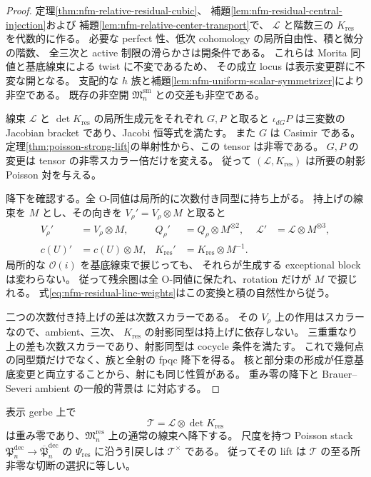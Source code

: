 \begin{proof}
定理\ref{thm:nfm-relative-residual-cubic}、
補題\ref{lem:nfm-residual-central-injection}および
補題\ref{lem:nfm-relative-center-transport}で、
$\mathcal L$ と階数三の $K_{\mathrm{res}}$ を代数的に作る。
必要な perfect 性、低次 cohomology の局所自由性、積と微分の階数、
全三次と active 制限の滑らかさは開条件である。
これらは Morita 同値と基底線束による twist に不変であるため、
その成立 locus は表示変更群に不変な開となる。
支配的な $h$ 族と補題\ref{lem:nfm-uniform-scalar-symmetrizer}により非空である。
既存の非空開 $\mathfrak M_n^{\mathrm{sm}}$ との交差も非空である。

線束 $\mathcal L$ と $\det K_{\mathrm{res}}$ の局所生成元をそれぞれ $G,P$ と取ると
$\iota_{dG}P$ は三変数の Jacobian bracket であり、Jacobi 恒等式を満たす。
また $G$ は Casimir である。
定理\ref{thm:poisson-strong-lift}の単射性から、この tensor は非零である。
$G,P$ の変更は tensor の非零スカラー倍だけを変える。
従って $(\mathcal L,K_{\mathrm{res}})$ は所要の射影 Poisson 対を与える。

降下を確認する。全 O-同値は局所的に次数付き同型に持ち上がる。
持上げの線束を $M$ とし、その向きを $V_\rho'=V_\rho\otimes M$ と取ると
\begin{equation}
\label{eq:nfm-residual-line-weights}
 \begin{aligned}
 V_\rho'&=V_\rho\otimes M,&
 Q_\rho'&=Q_\rho\otimes M^{\otimes2},&
 \mathcal L'&=\mathcal L\otimes M^{\otimes3},\\
 c(U)'&=c(U)\otimes M,&
 K_{\mathrm{res}}'&=K_{\mathrm{res}}\otimes M^{-1}.
 \end{aligned}
\end{equation}
局所的な $\mathcal O(i)$ を基底線束で捩じっても、
それらが生成する exceptional block は変わらない。
従って残余圏は全 O-同値に保たれ、rotation だけが $M$ で捩じれる。
式\eqref{eq:nfm-residual-line-weights}はこの変換と積の自然性から従う。

二つの次数付き持上げの差は次数スカラーである。
その $V_\rho$ 上の作用はスカラーなので、ambient、三次、
$K_{\mathrm{res}}$ の射影同型は持上げに依存しない。
三重重なり上の差も次数スカラーであり、射影同型は cocycle 条件を満たす。
これで幾何点の同型類だけでなく、族と全射の fpqc 降下を得る。
核と部分束の形成が任意基底変更と両立することから、射にも同じ性質がある。
重み零の降下と Brauer--Severi ambient の一般的背景は
\cite[Proposition~4.10; Remark~6.1]{NFMBerghSchnurer}に対応する。
\end{proof}

\begin{proposition}[尺度の線束]
\label{prop:nfm-residual-scale-torsor}
表示 gerbe 上で
\[
 \mathscr T=\mathcal L\otimes\det K_{\mathrm{res}}
\]
は重み零であり、$\mathfrak M_n^{\mathrm{res}}$ 上の通常の線束へ降下する。
尺度を持つ Poisson stack
$\mathfrak P_n^{\mathrm{dec}}\to\overline{\mathfrak P}_n^{\mathrm{dec}}$
の $\Psi_{\mathrm{res}}$ に沿う引戻しは $\mathscr T^\times$ である。
従ってその lift は $\mathscr T$ の至る所非零な切断の選択に等しい。
\end{proposition}

